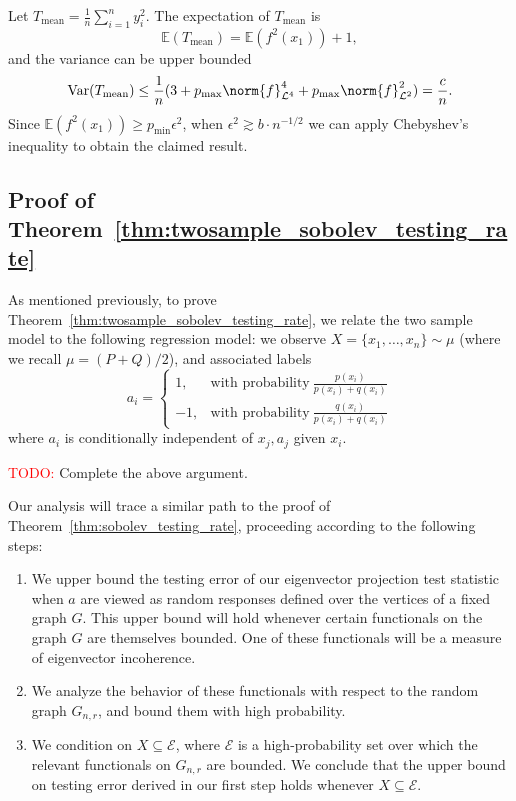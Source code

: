 \documentclass{article}
\newcommand{\Var}{\mathrm{Var}}
\newcommand{\1}{\mathbf{1}}
\newcommand{\Leb}{\mathcal{L}}
\newcommand{\Ebb}{\mathbb{E}}
\theoremstyle{alden}
\theoremstyle{aldenthm}
\theoremstyle{definition}
\theoremstyle{remark}
\begin{document}
Let $T_{\mathrm{mean}} = \frac{1}{n}\sum_{i = 1}^{n} y_i^2$. The expectation of $T_{\mathrm{mean}}$ is
\begin{equation*}
\Ebb(T_{\mathrm{mean}}) = \mathbb{E}(f^2(x_1)) + 1,
\end{equation*}
and the variance can be upper bounded
\begin{equation*}
\Var(T_{\mathrm{mean}}) \leq \frac{1}{n}(3 + p_{\max} \norm{f}_{\Leb^4}^4 + p_{\max}\norm{f}_{\Leb^2}^2) = \frac{c}{n}.
\end{equation*}
Since $\mathbb{E}(f^2(x_1)) \geq p_{\min} \epsilon^2$, when $\epsilon^2 \gtrsim b\cdot n^{-1/2}$ we can apply Chebyshev's inequality to obtain the claimed result.

\subsection{Proof of Theorem~\ref{thm:twosample_sobolev_testing_rate}}

As mentioned previously, to prove Theorem~\ref{thm:twosample_sobolev_testing_rate}, we relate the two sample model to the following regression model: we observe
$X = \{x_1,\ldots,x_n\} \sim \mu$ (where we recall $\mu = (P + Q)/2$), and associated labels
\begin{equation*}
a_i = 
\begin{cases}
1, & \textrm{with probability}~ \frac{p(x_i)}{p(x_i) + q(x_i)} \\
-1, & \textrm{with probability}~ \frac{q(x_i)}{p(x_i) + q(x_i)}
\end{cases}
\end{equation*}
where $a_i$ is conditionally independent of $x_j,a_j$ given $x_i$. 

\textcolor{red}{TODO:} Complete the above argument.

Our analysis will trace a similar path to the proof of Theorem~\ref{thm:sobolev_testing_rate}, proceeding according to the following steps:
\begin{enumerate}
	\item We upper bound the testing error of our eigenvector projection test statistic when $a$ are viewed as random responses defined over the vertices of a fixed graph $G$. This upper bound will hold whenever certain functionals on the graph $G$ are themselves bounded. One of these functionals will be a measure of eigenvector incoherence.
	\item We analyze the behavior of these functionals with respect to the random graph $G_{n,r}$, and bound them with high probability.
	\item We condition on $X \subseteq \mathcal{E}$, where $\mathcal{E}$ is a high-probability set over which the relevant functionals on $G_{n,r}$ are bounded. We conclude that the upper bound on testing error derived in our first step holds whenever $X \subseteq \mathcal{E}$. 
\end{enumerate}
\end{document}
